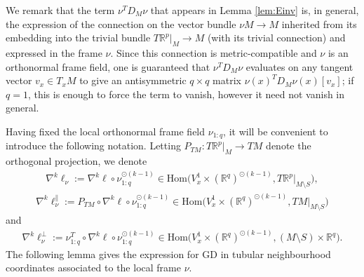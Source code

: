 \documentclass{article}
\newcommand{\RB}{\mathbb{R}}
\newcommand{\GD}{\mathrm{GD}}
\newcommand{\Hom}{\mathrm{Hom}}
\theoremstyle{plain}
\theoremstyle{definition}
\theoremstyle{remark}
\begin{document}
We remark that the term $\nu^TD_M\nu$ that appears in Lemma \ref{lem:Einv} is, in general, the expression of the connection on the vector bundle $\nu M\rightarrow M$ inherited from its embedding into the trivial bundle $T\RB^p|_M\rightarrow M$ (with its trivial connection) and expressed in the frame $\nu$. Since this connection is metric-compatible and $\nu$ is an orthonormal frame field, one is guaranteed that $\nu^TD_M\nu$ evaluates on any tangent vector $v_x\in T_xM$ to give an antisymmetric $q\times q$ matrix $\nu(x)^TD_M\nu(x)[v_x]$; if $q=1$, this is enough to force the term to vanish, however it need not vanish in general.

Having fixed the local orthonormal frame field $\nu_{1:q}$, it will be convenient to introduce the following notation. Letting $P_{TM}:T\RB^p|_M\rightarrow TM$ denote the orthogonal projection, we denote
\begin{align}
\nabla^k\ell_{\nu}:=\nabla^k\ell\circ \nu_{1:q}^{\odot (k-1)}\in \Hom\big(V^1_x\times(\RB^q)^{\odot(k-1)},T\RB^p|_{M\setminus S}\big),
\end{align}
\begin{align}
\nabla^k\ell_{\nu}^{\parallel}:=P_{TM}\circ \nabla^k\ell\circ\nu_{1:q}^{\odot (k-1)}\in\Hom\big(V^1_x\times(\RB^q)^{\odot(k-1)},TM|_{M\setminus S}\big)
\end{align}
and
\begin{align}
\nabla^k\ell_{\nu}^{\perp}:=\nu_{1:q}^T\circ\nabla^k\ell\circ \nu_{1:q}^{\odot(k-1)}\in\Hom\big(V^1_x\times(\RB^q)^{\odot(k-1)},(M\setminus S)\times\RB^q\big).
\end{align}
The following lemma gives the expression for $\GD$ in tubular neighbourhood coordinates associated to the local frame $\nu$.
\end{document}

